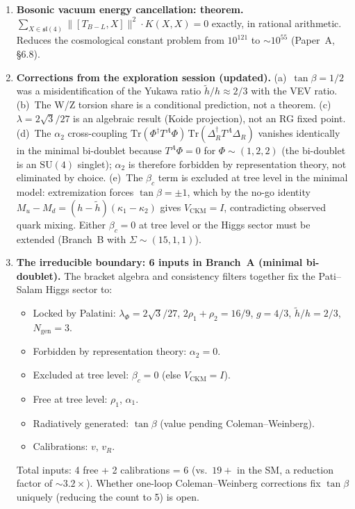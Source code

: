 \documentclass[11pt,a4paper]{article}
\theoremstyle{plain}
\theoremstyle{definition}
\theoremstyle{remark}
\begin{document}
\begin{enumerate}[label=(\arabic*)]
  \item \textbf{Bosonic vacuum energy cancellation: theorem.}
    $\sum_{X \in \mathfrak{sl}(4)} \|[T_{B{-}L}, X]\|^2 \cdot K(X,X) = 0$
    exactly, in rational arithmetic.  Reduces the cosmological constant
    problem from $10^{121}$ to $\sim 10^{55}$ (Paper~A, \S 6.8).

  \item \textbf{Corrections from the exploration session (updated).}
    (a)~$\tan\beta = 1/2$ was a misidentification of the Yukawa ratio
    $\tilde{h}/h \approx 2/3$ with the VEV ratio.
    (b)~The W/Z torsion share is a conditional prediction,
    not a theorem.  (c)~$\lambda = 2\sqrt{3}/27$ is an algebraic result
    (Koide projection), not an RG fixed point.
    (d)~The $\alpha_2$ cross-coupling
    $\mathrm{Tr}(\Phi^\dagger T^A \Phi)\,\mathrm{Tr}(\Delta_R^\dagger T^A \Delta_R)$
    vanishes identically in the minimal bi-doublet because
    $T^A \Phi = 0$ for $\Phi \sim (1, 2, 2)$ (the bi-doublet is an
    $\mathrm{SU}(4)$ singlet); $\alpha_2$ is therefore forbidden by
    representation theory, not eliminated by choice.
    (e)~The $\beta_c$ term is excluded at tree level in the minimal
    model: extremization forces $\tan\beta = \pm 1$, which by the
    no-go identity
    $M_u - M_d = (h - \tilde{h})(\kappa_1 - \kappa_2)$ gives
    $V_{\mathrm{CKM}} = I$, contradicting observed quark mixing.
    Either $\beta_c = 0$ at tree level or the Higgs sector must be
    extended (Branch~B with $\Sigma \sim (15, 1, 1)$).

  \item \textbf{The irreducible boundary: 6 inputs in Branch~A
    (minimal bi-doublet).}
    The bracket algebra and consistency filters together fix the
    Pati--Salam Higgs sector to:
    \begin{itemize}[noitemsep]
      \item Locked by Palatini: $\lambda_\Phi = 2\sqrt{3}/27$,
        $2\rho_1 + \rho_2 = 16/9$, $g = 4/3$, $\tilde{h}/h = 2/3$,
        $N_{\mathrm{gen}} = 3$.
      \item Forbidden by representation theory: $\alpha_2 = 0$.
      \item Excluded at tree level: $\beta_c = 0$ (else $V_{\mathrm{CKM}} = I$).
      \item Free at tree level: $\rho_1$, $\alpha_1$.
      \item Radiatively generated: $\tan\beta$ (value pending Coleman--Weinberg).
      \item Calibrations: $v$, $v_R$.
    \end{itemize}
    Total inputs: 4 free + 2 calibrations = 6 (vs.\ $19{+}$ in the SM,
    a reduction factor of $\sim 3.2\times$).  Whether one-loop
    Coleman--Weinberg corrections fix $\tan\beta$ uniquely (reducing
    the count to 5) is open.


\end{enumerate}
\end{document}
